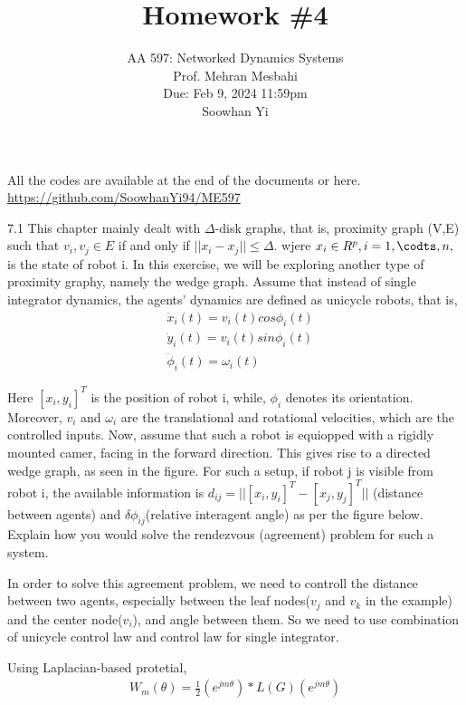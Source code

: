 \documentclass{article}
\begin{document}
\setcounter{problem}{0}
\title{Homework \#4}
\author{
    \normalsize{AA 597: Networked Dynamics Systems}\\
    \normalsize{Prof. Mehran Mesbahi}\\
    \normalsize{Due: Feb 9, 2024 11:59pm}\\
    \normalsize{Soowhan Yi}
}
\date{{}}
\maketitle

All the codes are available at the end of the documents or here.
\url{https://github.com/SoowhanYi94/ME597}
\begin{problem}7.1
    This chapter mainly dealt with $\Delta$-disk graphs, that is, proximity graph (V,E) such that ${v_i, v_j} \in E$ if and only if $||x_i - x_j|| \leq \Delta$. wjere $x_i \in R^p, i = 1, \codts, n, $ is the state of robot i. In this exercise, we will be exploring another type of proximity graphy, namely the wedge graph. Assume that instead of single integrator dynamics, the agents' dynamics are defined as unicycle robots, that is, 
    \begin{align*}
        &\dot x_i(t) = v_i(t) cos{\phi_i (t)}\\
        &\dot y_i(t) = v_i(t) sin{\phi_i (t)}\\
        &\dot \phi_i(t)= \omega_i(t)
    \end{align*}
    
    Here $[x_i, y_i]^T$ is the position of robot i, while, $\phi_i$ denotes its orientation. Moreover, $v_i$ and $\omega_i$ are the translational and rotational velocities, which are the controlled inputs. Now, assume that such a robot is equiopped with a rigidly mounted camer, facing in the forward direction. This gives rise to a directed wedge graph, as seen in the figure. For such a setup, if robot j is visible from robot i, the available information is $d_{ij} = ||[x_i, y_i]^T - [x_j, y_j]^T||$ (distance between agents) and $\delta \phi_{ij}$(relative interagent angle) as per the figure below. Explain how you would solve the rendezvous (agreement) problem for such a system. 
    
    \vspace{12pt}
    In order to solve this agreement problem, we need to controll the distance between two agents, especially between the leaf nodes($v_j$ and $v_k$ in the example) and the center node($v_i$), and angle between them. So we need to use combination of unicycle control law and control law for single integrator. 
      
    Using Laplacian-based protetial, 
    \begin{align*}
        W_m(\theta) = \frac{1}{2} (e^{jm\theta}) * L(G)(e^{jm\theta}) 
    \end{align*}
\end{problem}
\end{document}
